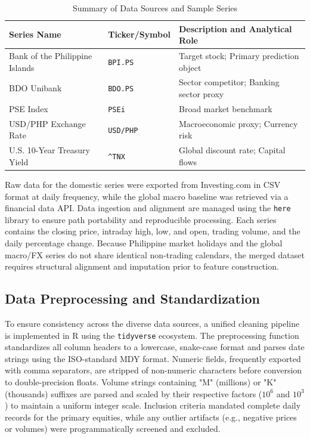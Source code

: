 \documentclass[12pt]{article}
\begin{document}
\begin{table}[ht!]
    \centering
    \caption{Summary of Data Sources and Sample Series}
    \label{tab:data_sources}
    \begin{tabularx}{\textwidth}{llX}
        \toprule
        Series Name & Ticker/Symbol & Description and Analytical Role \\
        \midrule
        Bank of the Philippine Islands & \texttt{BPI.PS} & Target stock; Primary prediction object \\
        BDO Unibank & \texttt{BDO.PS} & Sector competitor; Banking sector proxy \\
        PSE Index & \texttt{PSEi} & Broad market benchmark \\
        USD/PHP Exchange Rate & \texttt{USD/PHP} & Macroeconomic proxy; Currency risk \\
        U.S. 10-Year Treasury Yield & \texttt{\textasciicircum TNX} & Global discount rate; Capital flows \\
        \bottomrule
    \end{tabularx}
\end{table}

Raw data for the domestic series were exported from Investing.com in CSV format at daily frequency, while the global macro baseline was retrieved via a financial data API. Data ingestion and alignment are managed using the \texttt{here} library to ensure path portability and reproducible processing. Each series contains the closing price, intraday high, low, and open, trading volume, and the daily percentage change. Because Philippine market holidays and the global macro/FX series do not share identical non-trading calendars, the merged dataset requires structural alignment and imputation prior to feature construction.

\subsection{Data Preprocessing and Standardization}

To ensure consistency across the diverse data sources, a unified cleaning pipeline is implemented in R using the \texttt{tidyverse} ecosystem. The preprocessing function standardizes all column headers to a lowercase, snake-case format and parses date strings using the ISO-standard MDY format. Numeric fields, frequently exported with comma separators, are stripped of non-numeric characters before conversion to double-precision floats. Volume strings containing "M" (millions) or "K" (thousands) suffixes are parsed and scaled by their respective factors ($10^6$ and $10^3$) to maintain a uniform integer scale. Inclusion criteria mandated complete daily records for the primary equities, while any outlier artifacts (e.g., negative prices or volumes) were programmatically screened and excluded.
\end{document}

